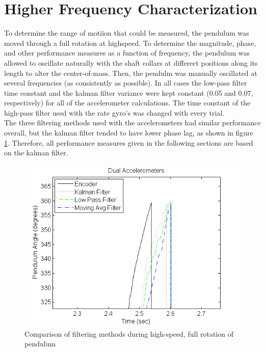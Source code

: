 \documentclass{article}
\theoremstyle{plain}
\theoremstyle{definition}
\theoremstyle{remark}
\begin{document}
\section{Higher Frequency Characterization}

To determine the range of motiion that could be measured, the pendulum was moved through a full rotation at highspeed. To determine the magnitude, phase, and other performance measures as a function of frequency, the pendulum was allowed to oscillate naturally with the shaft collars at differect positions along its length to alter the center-of-mass. Then, the pendulm was manually oscillated at several frequencies (as consistently as possible). In all cases the low-pass filter time constant and the kalman filter variance were kept constant (0.05 and 0.07, respectively) for all of the accelerometer calculations. The time constant of the high-pass filter used with the rate gyro's was changed with every trial.\\  

The three filtering methods used with the accelerometers had similar performance overall, but the kalman filter tended to have lower phase lag, as shown in figure \ref{kalman_lag}. Therefore, all performance measures given in the following sections are based on the kalman filter.\\

\begin{figure}[hbt]
\begin{center}
\includegraphics[width = 12cm]{Example_Kalman_Lag.png}
\caption{Comparison of filtering methods during high-speed, full rotation of pendulum}
\label{kalman_lag}
\end{center}
\end{figure}
\end{document}
